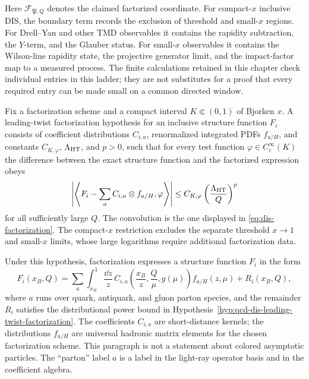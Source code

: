 Here \(\mathcal F_{\mathfrak P,Q}\) denotes the claimed factorized coordinate.
For compact-\(x\) inclusive DIS, the boundary term records the exclusion of
threshold and small-\(x\) regions.  For Drell--Yan and other TMD observables it
contains the rapidity subtraction, the \(Y\)-term, and the Glauber status.  For
small-\(x\) observables it contains the Wilson-line rapidity state, the
projective generator limit, and the impact-factor map to a measured process.
The finite calculations retained in this chapter check individual entries in
this ladder; they are not substitutes for a proof that every required entry can
be made small on a common directed window.

\begin{hypothesis}
\label{hyp:qcd-dis-leading-twist-factorization}
Fix a factorization scheme and a compact interval
\(K\Subset(0,1)\) of Bjorken \(x\).  A leading-twist factorization hypothesis for an
inclusive structure function \(F_i\) consists of coefficient distributions
\(C_{i,a}\), renormalized integrated PDFs \(f_{a/H}\), and constants
\(C_{K,\varphi}\), \(\Lambda_{\rm HT}\), and \(p>0\), such that for every test
function \(\varphi\in C_c^\infty(K)\) the difference between the exact
structure function and the factorized expression obeys
\[
  \left|
  \left\langle
  F_i-\sum_a C_{i,a}\otimes f_{a/H},\varphi
  \right\rangle
  \right|
  \le
  C_{K,\varphi}
  \left(\frac{\Lambda_{\rm HT}}{Q}\right)^p
\]
for all sufficiently large \(Q\).  The convolution is the one displayed in
\eqref{eq:dis-factorization}.  The compact-\(x\) restriction excludes the
separate threshold \(x\to1\) and small-\(x\) limits, whose large logarithms
require additional factorization data.
\end{hypothesis}

Under this hypothesis, factorization expresses a structure function \(F_i\) in
the form
\begin{equation}
  F_i(x_B,Q)
  =
  \sum_{a}
  \int_{x_B}^{1}\frac{\dd z}{z}\,
  C_{i,a}\!\left(\frac{x_B}{z},\frac{Q}{\mu},g(\mu)\right)
  f_{a/H}(z,\mu)
  +
  R_i(x_B,Q),
  \label{eq:dis-factorization}
\end{equation}
where \(a\) runs over quark, antiquark, and gluon parton species, and the
remainder \(R_i\) satisfies the distributional power bound in
Hypothesis~\ref{hyp:qcd-dis-leading-twist-factorization}.  The coefficients
\(C_{i,a}\) are short-distance kernels; the distributions \(f_{a/H}\) are
universal hadronic matrix elements for the chosen factorization scheme.  This
paragraph is not a statement about colored asymptotic particles.  The
``parton'' label \(a\) is a label in the light-ray operator basis and in the
coefficient algebra.

